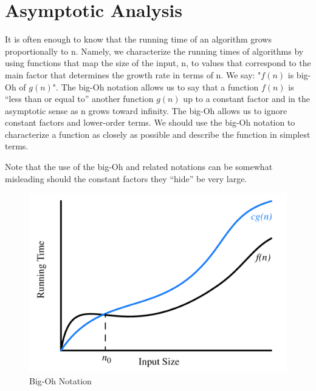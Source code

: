 \documentclass[../Main.tex]{subfiles}
\begin{document}
\section{Asymptotic Analysis}
It is often enough to know that the running time of an algorithm grows proportionally to n.
Namely, we characterize the running times of algorithms
by using functions that map the size of the input, n, to values that correspond to
the main factor that determines the growth rate in terms of n.
We say: "\(f(n)\) is big-Oh of \(g(n)\)".
The big-Oh notation allows us to say that a function \(f(n)\) is “less than or equal
to” another function \(g(n)\) up to a constant factor and in the asymptotic sense as n
grows toward infinity. The big-Oh allows us to ignore constant factors and lower-order terms.
We should use the big-Oh notation to characterize a function as closely
as possible and describe the function in simplest terms.

Note that the use of the big-Oh and related notations can be somewhat misleading 
should the constant factors they “hide” be very large. 

\begin{figure}[H]
    \centering
    \includegraphics[width=0.75\linewidth]{Images/onotation.png}
    \caption{Big-Oh Notation}
\end{figure}




\end{document}
